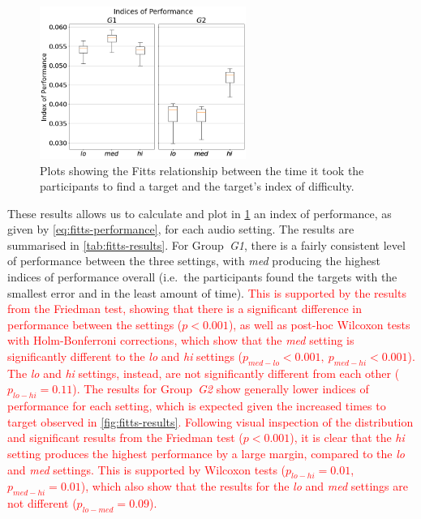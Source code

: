 \documentclass[acmsmall]{acmart}
\newcommand\hl[1]{\textcolor{red}{#1}}
\begin{document}
\begin{figure}
  \centering
  \includegraphics[width=0.6\textwidth]{figures/fitts_ips.png}
  \caption{Plots showing the Fitts relationship between the time it took the participants to find a target and the target's index of difficulty. }\label{fig:fitts-ips}
\end{figure}

These results allows us to calculate and plot in \cref{fig:fitts-ips} an index of performance, as given by \cref{eq:fitts-performance}, for each audio setting.
The results are summarised in \cref{tab:fitts-results}.
For Group~\textit{G1}, there is a fairly consistent level of performance between the three settings, with \textit{med} producing the highest indices of performance overall (i.e.\ the participants found the targets with the smallest error and in the least amount of time).
\hl{This is supported by the results from the Friedman test, showing that there is a significant difference in performance between the settings ($p < 0.001$), as well as post-hoc Wilcoxon tests with Holm-Bonferroni corrections, which show that the \textit{med} setting is significantly different to the \textit{lo} and \textit{hi} settings ($p_{med-lo} < 0.001,~p_{med-hi} < 0.001$). 
The \textit{lo} and \textit{hi} settings, instead, are not significantly different from each other ($p_{lo-hi} = 0.11$).
The results for Group~\textit{G2} show generally lower indices of performance for each setting, which is expected given the increased times to target observed in \cref{fig:fitts-results}.
Following visual inspection of the distribution and significant results from the Friedman test ($p < 0.001$), it is clear that the \textit{hi} setting produces the highest performance by a large margin, compared to the \textit{lo} and \textit{med} settings. 
This is supported by Wilcoxon tests ($p_{lo-hi}=0.01$, $p_{med-hi}=0.01$), which also show that the results for the \textit{lo} and \textit{med} settings are not different ($p_{lo-med}=0.09$).}
\end{document}

